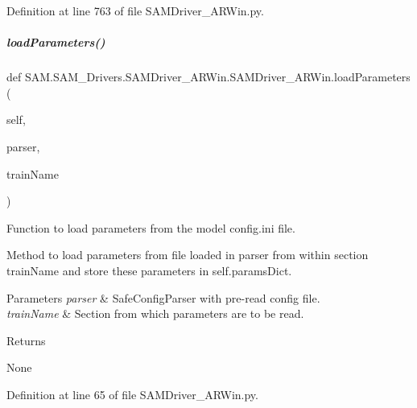 Definition at line 763 of file S\+A\+M\+Driver\+\_\+\+A\+R\+Win.\+py.

\mbox{\label{group__icubclient__SAM__Drivers_a51c7b0fd9952b5cb0d347912ce12d14e}} 
\subparagraph{\texorpdfstring{load\+Parameters()}{loadParameters()}}
{\footnotesize\ttfamily def S\+A\+M.\+S\+A\+M\+\_\+\+Drivers.\+S\+A\+M\+Driver\+\_\+\+A\+R\+Win.\+S\+A\+M\+Driver\+\_\+\+A\+R\+Win.\+load\+Parameters (\begin{DoxyParamCaption}\item[{}]{self,  }\item[{}]{parser,  }\item[{}]{train\+Name }\end{DoxyParamCaption})}



Function to load parameters from the model config.\+ini file. 

Method to load parameters from file loaded in parser from within section train\+Name and store these parameters in self.\+params\+Dict.


\begin{DoxyParams}{Parameters}
{\em parser} & Safe\+Config\+Parser with pre-\/read config file. \\
\hline
{\em train\+Name} & Section from which parameters are to be read.\\
\hline
\end{DoxyParams}
\begin{DoxyReturn}{Returns}


None 
\end{DoxyReturn}


Definition at line 65 of file S\+A\+M\+Driver\+\_\+\+A\+R\+Win.\+py.

